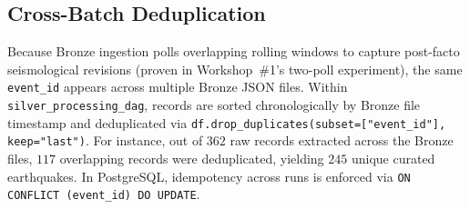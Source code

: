\subsection{Cross-Batch Deduplication}
Because Bronze ingestion polls overlapping rolling windows to capture post-facto seismological revisions (proven in Workshop~\#1's two-poll experiment), the same \texttt{event\_id} appears across multiple Bronze JSON files. Within \texttt{silver\_processing\_dag}, records are sorted chronologically by Bronze file timestamp and deduplicated via \texttt{df.drop\_duplicates(subset=["event\_id"], keep="last")}. For instance, out of $362$ raw records extracted across the Bronze files, $117$ overlapping records were deduplicated, yielding $245$ unique curated earthquakes. In PostgreSQL, idempotency across runs is enforced via \texttt{ON CONFLICT (event\_id) DO UPDATE}.
